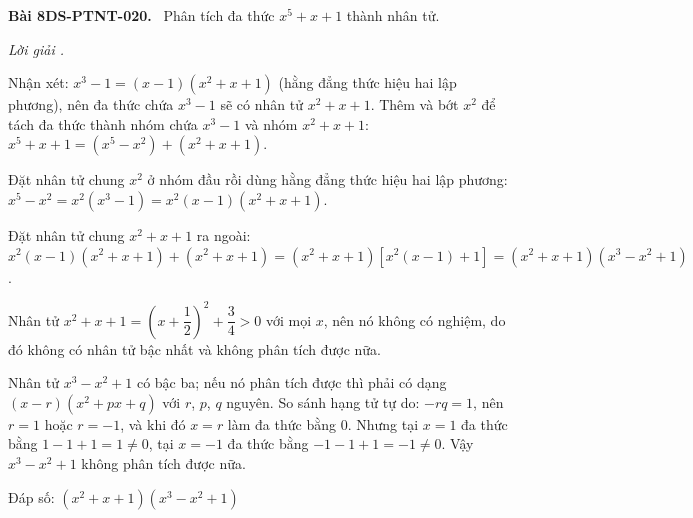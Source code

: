 \documentclass[12pt,a4paper]{article}
\newenvironment{problem}[1][]{\par\medskip\noindent\textbf{Bài #1.}\ }{\par}
\newenvironment{solution}[1][]{\par\noindent\textit{Lời giải #1.}\par}{\par}
\begin{document}
\begin{problem}[8DS-PTNT-020]
Phân tích đa thức $x^5 + x + 1$ thành nhân tử.

\begin{solution}
Nhận xét: $x^3 - 1 = (x - 1)(x^2 + x + 1)$ (hằng đẳng thức hiệu hai lập phương), nên đa thức chứa $x^3 - 1$ sẽ có nhân tử $x^2 + x + 1$. Thêm và bớt $x^2$ để tách đa thức thành nhóm chứa $x^3 - 1$ và nhóm $x^2 + x + 1$: $x^5 + x + 1 = (x^5 - x^2) + (x^2 + x + 1)$.

Đặt nhân tử chung $x^2$ ở nhóm đầu rồi dùng hằng đẳng thức hiệu hai lập phương: $x^5 - x^2 = x^2(x^3 - 1) = x^2(x - 1)(x^2 + x + 1)$.

Đặt nhân tử chung $x^2 + x + 1$ ra ngoài: $x^2(x - 1)(x^2 + x + 1) + (x^2 + x + 1) = (x^2 + x + 1)\left[x^2(x - 1) + 1\right] = (x^2 + x + 1)(x^3 - x^2 + 1)$.

Nhân tử $x^2 + x + 1 = \left(x + \dfrac{1}{2}\right)^2 + \dfrac{3}{4} > 0$ với mọi $x$, nên nó không có nghiệm, do đó không có nhân tử bậc nhất và không phân tích được nữa.

Nhân tử $x^3 - x^2 + 1$ có bậc ba; nếu nó phân tích được thì phải có dạng $(x - r)(x^2 + px + q)$ với $r$, $p$, $q$ nguyên. So sánh hạng tử tự do: $-rq = 1$, nên $r = 1$ hoặc $r = -1$, và khi đó $x = r$ làm đa thức bằng $0$. Nhưng tại $x = 1$ đa thức bằng $1 - 1 + 1 = 1 \neq 0$, tại $x = -1$ đa thức bằng $-1 - 1 + 1 = -1 \neq 0$. Vậy $x^3 - x^2 + 1$ không phân tích được nữa.

Đáp số: $\boxed{(x^2 + x + 1)(x^3 - x^2 + 1)}$
\end{solution}
\end{problem}
\end{document}
